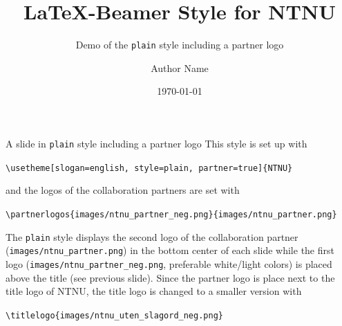 \documentclass[aspectratio=169]{beamer}
\title{\LaTeX{}-Beamer Style for NTNU}
\subtitle{Demo of the  \texttt{plain} style including a partner logo}
\author{Author Name}
\date{\today}
\begin{document}
	\maketitle
	\begin{frame}[fragile]{A slide in \texttt{plain} style including a partner logo}
		This style is set up with

		\lstinline!\usetheme[slogan=english, style=plain, partner=true]{NTNU}!

		and the logos of the collaboration partners are set with

		\lstinline!\partnerlogos{images/ntnu_partner_neg.png}{images/ntnu_partner.png}!

		The \texttt{plain} style displays the second logo of the
		collaboration partner (\lstinline!images/ntnu_partner.png!) in the
		bottom center of each slide while the first logo
		(\lstinline!images/ntnu_partner_neg.png!, preferable white/light colors)
		is placed above the title (see previous slide). Since the partner
		logo is place next to the title logo of NTNU, the title logo is
		changed to a smaller version with

		\lstinline!\titlelogo{images/ntnu_uten_slagord_neg.png}!
	\end{frame}
\end{document}
